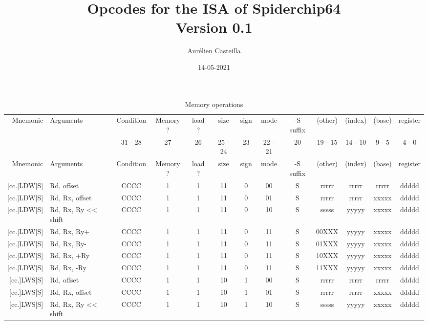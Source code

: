 \documentclass{article}
\author{Aurélien Casteilla}
\title{Opcodes for the ISA of Spiderchip64 \\[1ex] \large Version 0.1}
\date{14-05-2021}
\begin{document}
\maketitle
\newpage


\ttfamily
\begin{longtable}{|r|l|c|c|c|c|c|c|c|ccc|c|}
    \caption{Memory operations} \\
    \hline
    Mnemonic & Arguments & Condition & Memory ? & load ? & size & sign & mode & -S suffix & (other) & (index) & (base) & register \\
    & & 31 - 28 & 27 & 26 & 25 - 24 & 23 & 22 - 21 & 20 & 19 - 15 & 14 - 10 & 9 - 5 & 4 - 0 \\
    \hline
    \endfirsthead
    \hline
    Mnemonic & Arguments & Condition & Memory ? & load ? & size & sign & mode & -S suffix & (other) & (index) & (base) & register \\
    \hline
    \endhead
    \hline
    \endfoot
    \hline
    \endlastfoot
        {[}cc.]LDW[S] & Rd, offset & CCCC & 1 & 1 & 11 & 0 & 00 & S & rrrrr & rrrrr & rrrrr & ddddd \\
        {[}cc.]LDW[S] & Rd, Rx, offset & CCCC & 1 & 1 & 11 & 0 & 01 & S & rrrrr & rrrrr & xxxxx & ddddd \\
        {[}cc.]LDW[S] & Rd, Rx, Ry << shift & CCCC & 1 & 1 & 11 & 0 & 10 & S & sssss & yyyyy & xxxxx & ddddd \\
        {[}cc.]LDW[S] & Rd, Rx, Ry+ & CCCC & 1 & 1 & 11 & 0 & 11 & S & 00XXX & yyyyy & xxxxx & ddddd \\
        {[}cc.]LDW[S] & Rd, Rx, Ry- & CCCC & 1 & 1 & 11 & 0 & 11 & S & 01XXX & yyyyy & xxxxx & ddddd \\
        {[}cc.]LDW[S] & Rd, Rx, +Ry & CCCC & 1 & 1 & 11 & 0 & 11 & S & 10XXX & yyyyy & xxxxx & ddddd \\
        {[}cc.]LDW[S] & Rd, Rx, -Ry & CCCC & 1 & 1 & 11 & 0 & 11 & S & 11XXX & yyyyy & xxxxx & ddddd \\
        \hline %
        {[}cc.]LWS[S] & Rd, offset & CCCC & 1 & 1 & 10 & 1 & 00 & S & rrrrr & rrrrr & rrrrr & ddddd \\
        {[}cc.]LWS[S] & Rd, Rx, offset & CCCC & 1 & 1 & 10 & 1 & 01 & S & rrrrr & rrrrr & xxxxx & ddddd \\
        {[}cc.]LWS[S] & Rd, Rx, Ry << shift & CCCC & 1 & 1 & 10 & 1 & 10 & S & sssss & yyyyy & xxxxx & ddddd \\

\end{longtable}
\end{document}
